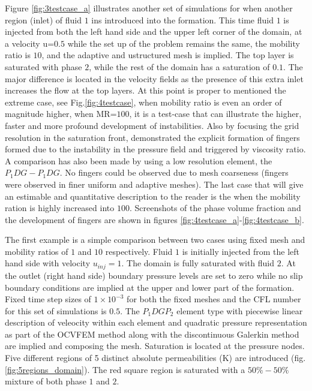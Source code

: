 \documentclass[preprint,authoryear,12pt]{elsarticle}
\begin{document}
\medskip
Figure \ref{fig:3testcase_a} illustrates another set of simulations for when another region (inlet) of fluid $1$ ins introduced into the formation. This time fluid $1$ is injected from both the left hand side and the upper left corner of the domain, at a velocity u=$0.5$ while the set up of the problem remains the same, the mobility ratio is $10$, and the adaptive and ustructured mesh is implied. The top layer is saturated with phase $2$, while the rest of the domain has a saturation of $0.1$. The major difference is located in the velocity fields %
as the presence of this extra inlet increases the flow at the top layers. At this point is proper to mentioned the extreme case, see Fig.\ref{fig:4testcase}, when mobility ratio is even an order of magnitude higher, when MR=$100$, 
it is a test-case that can illustrate the higher, faster and more profound development of instabilities. Also by focusing the grid resolution in the saturation front, \citet{christou_2015}  demonstrated the explicit formation of fingers formed due to the instability in the pressure ﬁeld and triggered by viscosity ratio. A comparison has also been made by using a low resolution element, the $P_{1}DG-P_{1}DG$. No fingers could be observed due to mesh coarseness (fingers were observed in ﬁner uniform and adaptive meshes). The last case that will give an estimable and quantitative description to the reader is the when the mobility ration is highly increased into $100$. Screenshots of the phase volume fraction and the development of fingers are shown in figures \ref{fig:4testcase_a}-\ref{fig:4testcase_b}.

\medskip
The first example is a simple comparison between two cases using fixed mesh and mobility ratios of $1$ and $10$ respectively. 
Fluid $1$ is initially injected from the left hand side with velocity $u_{inj}=1$. The domain is fully saturated with fluid $2$. At the outlet (right hand side) boundary pressure levels are set to zero while no slip boundary conditions are implied at the upper and lower part of the formation. Fixed time step sizes of $1 \times 10^{-3}$ for both the fixed meshes and the CFL number for this set of simulations is $0.5$. The $P_{1}DGP_{2}$ element type with piecewise linear description of veleocity within each element and quadratic pressure representation as part of the OCVFEM method along with the discontinuous Galerkin method are implied and composing the mesh. Saturation is located at the pressure nodes. Five different regions of 5 distinct absolute permeabilities (K) are introduced (fig.\ref{fig:5regions_domain}). The red square region is saturated with a $50\%-50\%$ mixture of both phase $1$ and $2$. 
\end{document}
